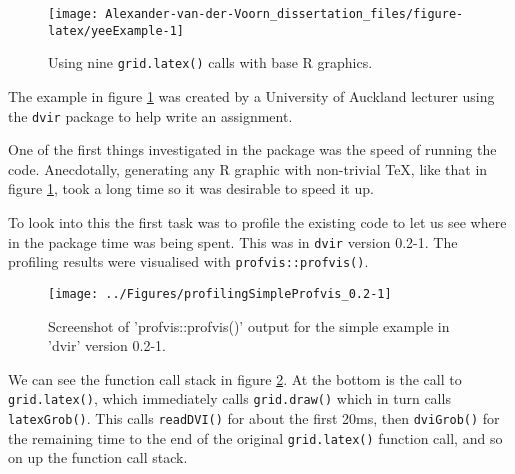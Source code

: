 \documentclass[]{article}
\newenvironment{Shaded}{\begin{snugshade}}{\end{snugshade}}
\newcommand{\KeywordTok}[1]{\textcolor[rgb]{0.13,0.29,0.53}{\textbf{#1}}}
\newcommand{\DataTypeTok}[1]{\textcolor[rgb]{0.13,0.29,0.53}{#1}}
\newcommand{\FloatTok}[1]{\textcolor[rgb]{0.00,0.00,0.81}{#1}}
\newcommand{\CharTok}[1]{\textcolor[rgb]{0.31,0.60,0.02}{#1}}
\newcommand{\StringTok}[1]{\textcolor[rgb]{0.31,0.60,0.02}{#1}}
\newcommand{\NormalTok}[1]{#1}
\begin{document}
\begin{Shaded}
\end{Shaded}

\begin{figure}

{\centering \texttt{[image: Alexander-van-der-Voorn\_dissertation\_files/figure-latex/yeeExample-1]} 

}

\caption{Using nine \texttt{grid.latex()} calls with base R graphics.}\label{fig:yeeExample}
\end{figure}

The example in figure \ref{fig:yeeExample} was created by a University
of Auckland lecturer using the \texttt{dvir} package to help write an
assignment.

One of the first things investigated in the package was the speed of
running the code. Anecdotally, generating any R graphic with non-trivial
\TeX{}, like that in figure \ref{fig:yeeExample}, took a long time so it
was desirable to speed it up.

To look into this the first task was to profile the existing code to let
us see where in the package time was being spent. This was in
\texttt{dvir} version 0.2-1. The profiling results were visualised with
\texttt{profvis::profvis()}.

\begin{figure}

{\centering \texttt{[image: ../Figures/profilingSimpleProfvis\_0.2-1]} 

}

\caption{Screenshot of 'profvis::profvis()' output for the simple example in 'dvir' version 0.2-1.}\label{fig:prof1}
\end{figure}

We can see the function call stack in figure \ref{fig:prof1}. At the
bottom is the call to \texttt{grid.latex()}, which immediately calls
\texttt{grid.draw()} which in turn calls \texttt{latexGrob()}. This
calls \texttt{readDVI()} for about the first 20ms, then
\texttt{dviGrob()} for the remaining time to the end of the original
\texttt{grid.latex()} function call, and so on up the function call
stack.
\end{document}
